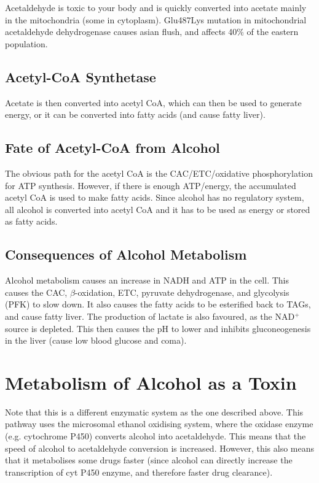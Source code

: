 Acetaldehyde is toxic to your body and is quickly converted into acetate mainly in the mitochondria (some in cytoplasm).
Glu487Lys mutation in mitochondrial acetaldehyde dehydrogenase causes asian flush, and affects 40\% of the eastern population.

\subsection{Acetyl-CoA Synthetase}

\begin{center}
\end{center}

Acetate is then converted into acetyl CoA, which can then be used to generate energy, or it can be converted into fatty acids (and cause fatty liver).

\subsection{Fate of Acetyl-CoA from Alcohol}

The obvious path for the acetyl CoA is the CAC/ETC/oxidative phosphorylation for ATP synthesis.
However, if there is enough ATP/energy, the accumulated acetyl CoA is used to make fatty acids.
Since alcohol has no regulatory system, all alcohol is converted into acetyl CoA and it has to be used as energy or stored as fatty acids.

\subsection{Consequences of Alcohol Metabolism}

Alcohol metabolism causes an increase in NADH and ATP in the cell.
This causes the CAC, $\beta$-oxidation, ETC, pyruvate dehydrogenase, and glycolysis (PFK) to slow down.
It also causes the fatty acids to be esterified back to TAGs, and cause fatty liver.
The production of lactate is also favoured, as the NAD$^+$ source is depleted.
This then causes the pH to lower and inhibits gluconeogenesis in the liver (cause low blood glucose and coma).

\section{Metabolism of Alcohol as a Toxin}

Note that this is a different enzymatic system as the one described above.
This pathway uses the microsomal ethanol oxidising system, where the oxidase enzyme (e.g. cytochrome P450) converts alcohol into acetaldehyde.
This means that the speed of alcohol to acetaldehyde conversion is increased.
However, this also means that it metabolises some drugs faster (since alcohol can directly increase the transcription of cyt P450 enzyme, and therefore faster drug clearance).

\begin{center}
\end{center}

